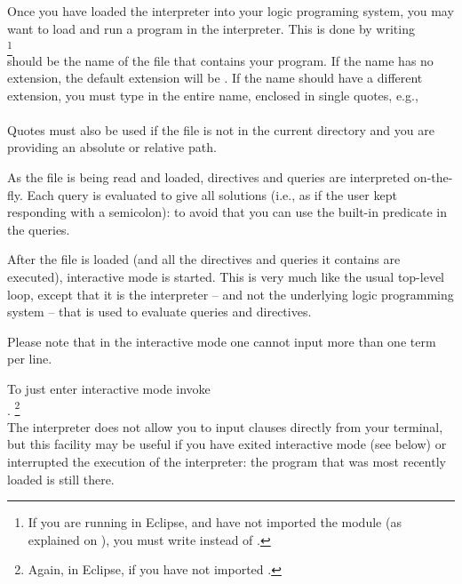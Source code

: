 


Once you have loaded the interpreter into your logic programing system, you
may want to load and run a program in the interpreter. This is done by
writing\\
\ind{}%
\footnote{
  If you are running in Eclipse, and have not imported the module 
  (as explained on ), you must write 
  instead of .
}\\
 should be the name of the file that contains your program.
If the name has no extension, the default extension will be .%
%
If the name should have a different extension, you must type in the entire
name, enclosed in single quotes, e.g.,\\
\ind{}\\
Quotes must also be used if the file is not in the current directory and you
are providing an absolute or relative path.

As the file is being read and loaded, directives and queries are interpreted
on-the-fly. Each query is evaluated to give all solutions (i.e., as if the
user kept responding with a semicolon): to avoid that you can use the
built-in predicate  in the queries.



After the file is loaded (and all the directives and queries it contains are
executed), interactive mode is started.  This is very much like the usual
top-level loop, except that it is the interpreter -- and not the
underlying logic programming system -- that is used to evaluate queries and
directives.

Please note that in the interactive mode one cannot input more than one term
per line.

To just enter interactive mode invoke\\
\ind{}.%
\footnote{Again,  in Eclipse, if you have not imported
  .}\\
 The interpreter does not allow you to input clauses directly from your
 terminal, but this facility may be useful if you have exited interactive
 mode (see below) or interrupted the execution of the interpreter: the
 program that was most recently loaded is still there.

